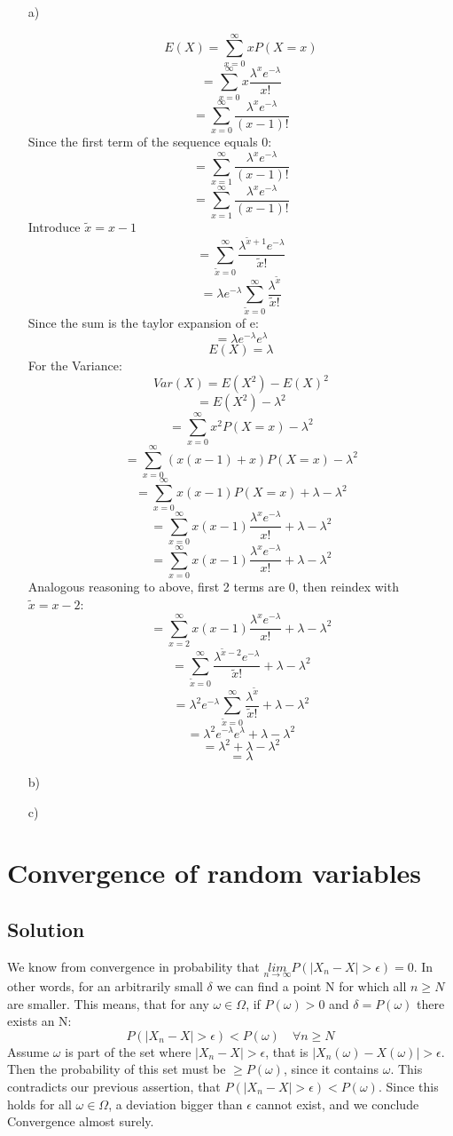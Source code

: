 \documentclass[10pt]{article}
\numberwithin{equation}{section}
\begin{document}
\begin{enumerate}
\item[a)]{
    $$E(X) = \sum_{x=0}^{\infty} x P(X=x)$$
    $$= \sum_{x=0}^{\infty} x \frac{\lambda^x e^{-\lambda}}{x!}$$
    $$= \sum_{x=0}^{\infty} \frac{\lambda^x e^{-\lambda}}{(x-1)!}$$
    Since the first term of the sequence equals 0:
    $$= \sum_{x=1}^{\infty} \frac{\lambda^x e^{-\lambda}}{(x-1)!}$$
    $$= \sum_{x=1}^{\infty} \frac{\lambda^x e^{-\lambda}}{(x-1)!}$$
    Introduce $\tilde{x} = x -1$
    $$= \sum_{\tilde{x}=0}^{\infty} \frac{\lambda^{\tilde{x}+1} e^{-\lambda}}{\tilde{x}!}$$
    $$= \lambda e^{-\lambda}\sum_{\tilde{x}=0}^{\infty} \frac{\lambda^{\tilde{x}}}{\tilde{x}!}$$
    Since the sum is the taylor expansion of e:
    $$= \lambda e^{-\lambda}e^{\lambda}$$
    $$E(X)=\lambda$$
    For the Variance:
    $$Var(X) = E(X^2) - E(X)^2$$
    $$= E(X^2) - \lambda^2$$
    $$= \sum_{x=0}^{\infty} x^2 P(X=x) - \lambda^2$$
    $$= \sum_{x=0}^{\infty} (x(x-1) + x) P(X=x) - \lambda^2$$
    $$= \sum_{x=0}^{\infty} x(x-1) P(X=x)  + \lambda - \lambda^2$$
    $$= \sum_{x=0}^{\infty} x(x-1) \frac{\lambda^x e^{-\lambda}}{x!}  + \lambda - \lambda^2$$
    $$= \sum_{x=0}^{\infty} x(x-1) \frac{\lambda^x e^{-\lambda}}{x!}  + \lambda - \lambda^2$$
    Analogous reasoning to above, first 2 terms are 0, then reindex with $\tilde{x} = x -2$:
    $$= \sum_{x=2}^{\infty} x(x-1) \frac{\lambda^x e^{-\lambda}}{x!}  + \lambda - \lambda^2$$
    $$= \sum_{\tilde{x}=0}^{\infty} \frac{\lambda^{\tilde{x} -2} e^{-\lambda}}{\tilde{x}!}  + \lambda - \lambda^2$$
    $$= \lambda^2 e^{-\lambda} \sum_{\tilde{x}=0}^{\infty} \frac{\lambda^{\tilde{x}}}{\tilde{x}!}  + \lambda - \lambda^2$$
    $$= \lambda^2 e^{-\lambda} e^{\lambda} + \lambda - \lambda^2$$
    $$= \lambda^2 + \lambda - \lambda^2$$
    $$= \lambda$$


}
\item[b)]{

}
\item[c)]{


}
\end{enumerate}

\section*{Convergence of random variables}
\subsection*{Solution}
We know from convergence in probability that $\underset{n\rightarrow \infty}{lim}P(|X_n - X| > \epsilon) = 0$. In other words, for an arbitrarily small $\delta$ we can find a point N for which all $n\geq N$ are smaller.
This means, that for any $\omega \in \Omega$, if $P(\omega) > 0$  and $\delta = P(\omega)$ there exists an N:
$$P(|X_n - X| > \epsilon) < P(\omega)\quad \forall n \geq N$$
Assume $\omega$ is part of the set where $|X_n -X|> \epsilon$, that is $|X_n(\omega) -X(\omega)|> \epsilon$.
Then the probability of this set must be $\geq P(\omega)$, since it contains $\omega$. This contradicts our previous assertion, that $P(|X_n - X| > \epsilon) < P(\omega)$.
Since this holds for all $\omega \in \Omega$, a deviation bigger than $\epsilon$ cannot exist, and we conclude Convergence almost surely.
\end{document}
